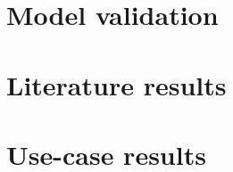 \section{Model validation}
\label{exp:model_tests}



\section{Literature results}
\label{exp:literature_tests}

\section{Use-case results}
\label{exp:usecase_results}

